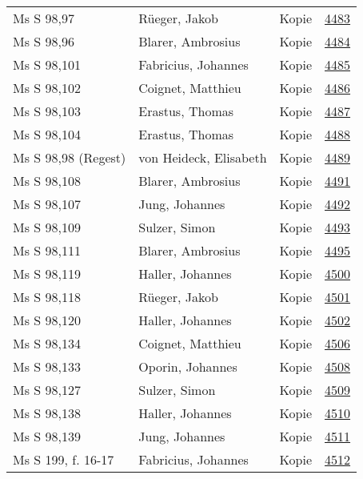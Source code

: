 \documentclass[10pt,a4paper,landscape]{report}
\begin{document}
\begin{longtable}{p{16cm}p{4cm}lr}
Ms S 98,97	&	Rüeger, Jakob	&	Kopie	&	\href{http://130.60.24.72/assignment/4483}{4483}\\
Ms S 98,96	&	Blarer, Ambrosius	&	Kopie	&	\href{http://130.60.24.72/assignment/4484}{4484}\\
Ms S 98,101	&	Fabricius, Johannes	&	Kopie	&	\href{http://130.60.24.72/assignment/4485}{4485}\\
Ms S 98,102	&	Coignet, Matthieu	&	Kopie	&	\href{http://130.60.24.72/assignment/4486}{4486}\\
Ms S 98,103	&	Erastus, Thomas	&	Kopie	&	\href{http://130.60.24.72/assignment/4487}{4487}\\
Ms S 98,104	&	Erastus, Thomas	&	Kopie	&	\href{http://130.60.24.72/assignment/4488}{4488}\\
Ms S 98,98 (Regest)	&	von Heideck, Elisabeth	&	Kopie	&	\href{http://130.60.24.72/assignment/4489}{4489}\\
Ms S 98,108	&	Blarer, Ambrosius	&	Kopie	&	\href{http://130.60.24.72/assignment/4491}{4491}\\
Ms S 98,107	&	Jung, Johannes	&	Kopie	&	\href{http://130.60.24.72/assignment/4492}{4492}\\
Ms S 98,109	&	Sulzer, Simon	&	Kopie	&	\href{http://130.60.24.72/assignment/4493}{4493}\\
Ms S 98,111	&	Blarer, Ambrosius	&	Kopie	&	\href{http://130.60.24.72/assignment/4495}{4495}\\
Ms S 98,119	&	Haller, Johannes	&	Kopie	&	\href{http://130.60.24.72/assignment/4500}{4500}\\
Ms S 98,118	&	Rüeger, Jakob	&	Kopie	&	\href{http://130.60.24.72/assignment/4501}{4501}\\
Ms S 98,120	&	Haller, Johannes	&	Kopie	&	\href{http://130.60.24.72/assignment/4502}{4502}\\
Ms S 98,134	&	Coignet, Matthieu	&	Kopie	&	\href{http://130.60.24.72/assignment/4506}{4506}\\
Ms S 98,133	&	Oporin, Johannes	&	Kopie	&	\href{http://130.60.24.72/assignment/4508}{4508}\\
Ms S 98,127	&	Sulzer, Simon	&	Kopie	&	\href{http://130.60.24.72/assignment/4509}{4509}\\
Ms S 98,138	&	Haller, Johannes	&	Kopie	&	\href{http://130.60.24.72/assignment/4510}{4510}\\
Ms S 98,139	&	Jung, Johannes	&	Kopie	&	\href{http://130.60.24.72/assignment/4511}{4511}\\
Ms S 199, f. 16-17	&	Fabricius, Johannes	&	Kopie	&	\href{http://130.60.24.72/assignment/4512}{4512}\\

\end{longtable}
\end{document}
